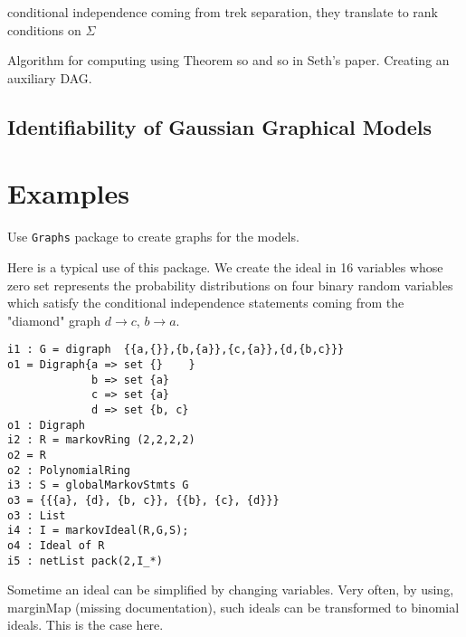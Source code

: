 \documentclass[10pt]{article}
\theoremstyle{definition}
\begin{document}
conditional independence coming from trek separation,
they translate to rank conditions on $\Sigma$

Algorithm for computing using Theorem so and so in Seth's
paper. Creating an auxiliary DAG.

\subsection{Identifiability of Gaussian Graphical Models}


\section{Examples}

Use {\tt Graphs} package to create graphs for the models.

Here is a typical use of this package. We create the ideal in 16
variables whose zero set represents the probability distributions on
four binary random variables which satisfy the conditional
independence statements coming from the "diamond" graph $d \rightarrow
c$, $b \rightarrow a$.

\begin{verbatim}
i1 : G = digraph  {{a,{}},{b,{a}},{c,{a}},{d,{b,c}}}
o1 = Digraph{a => set {}    }
             b => set {a}
             c => set {a}
             d => set {b, c}
o1 : Digraph
i2 : R = markovRing (2,2,2,2)
o2 = R
o2 : PolynomialRing
i3 : S = globalMarkovStmts G
o3 = {{{a}, {d}, {b, c}}, {{b}, {c}, {d}}}
o3 : List
i4 : I = markovIdeal(R,G,S);
o4 : Ideal of R
i5 : netList pack(2,I_*)
\end{verbatim}

Sometime an ideal can be simplified by changing variables. Very often, by using, marginMap (missing documentation), such ideals can be transformed to binomial ideals. This is the case here.
\end{document}
